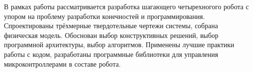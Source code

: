 
В рамках работы рассматривается разработка шагающего четырехногого робота с упором на проблему разработки конечностей и программирования. Спроектированы трёхмерные твердотельные чертежи системы, собрана физическая модель. Обоснован выбор конструктивных решений, выбор программной архитектуры, выбор алгоритмов. Применены лучшие практики работы с кодом, разработаны программные библиотеки для управления микроконтроллерами в составе робота.


